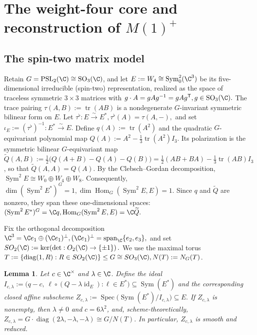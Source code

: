 \documentclass[12pt,leqno]{amsart}
\numberwithin{equation}{section} \newtheorem{thm}{Theorem}[section] \newtheorem{lem}[thm]{Lemma} \newtheorem{ex}[thm]{Example} \newtheorem{prop}[thm]{Proposition} \newtheorem{cor}[thm]{Corollary} \newtheorem{defi}[thm]{Definition} \newtheorem{rmk}[thm]{Remark} \newtheorem{notation}[thm]{Notation}
\newcommand{\id}{\operatorname{id}}
\newcommand{\Sym}{\operatorname{Sym}}
\newcommand{\Spec}{\operatorname{Spec}}
\newcommand{\Hom}{\operatorname{Hom}}
\newcommand{\SO}{\operatorname{SO}}
\newcommand{\PSLtwo}{\operatorname{PSL}_2(\C)}
\begin{document}
\section{The weight-four core and reconstruction of \texorpdfstring{$M(1)^+$}{M(1)+}}\label{sec:weight4}

\subsection{The spin-two matrix model}

Retain \(G=\PSLtwo\cong\SO_3(\C)\), and let $ E:=W_4\cong\Sym^2_0(\C^3) $ be its five-dimensional irreducible (spin-two) representation, realized as the space of traceless symmetric \(3\times3\) matrices with $ g\cdot A=gAg^{-1}=gAg^{\mathsf T}, g\in \SO_3(\C). $ The trace pairing $ \tau(A,B):=\operatorname{tr}(AB) $ is a nondegenerate \(G\)-invariant symmetric bilinear form on \(E\). Let $\tau^\flat:E\overset{\sim}{\longrightarrow}E^*,\tau^\flat(A)=\tau(A,-),$ and set $ \iota_E:=(\tau^\flat)^{-1}:E^*\overset{\sim}{\longrightarrow}E. $ Define $ q(A):=\operatorname{tr}(A^2) $ and the quadratic \(G\)-equivariant polynomial map $ Q(A):=A^2-\frac13\operatorname{tr}(A^2)I_3. $ Its polarization is the symmetric bilinear \(G\)-equivariant map \(\widetilde Q(A,B):= \frac12\bigl(Q(A+B)-Q(A)-Q(B)\bigr) = \frac12(AB+BA)-\frac13\operatorname{tr}(AB)I_3\), so that \(\widetilde Q(A,A)=Q(A)\). By the Clebsch--Gordan decomposition, $ \Sym^2E\cong W_0\oplus W_4\oplus W_8. $ Consequently, $ \dim(\Sym^2E^*)^G=1, \dim\Hom_G(\Sym^2E,E)=1. $ Since \(q\) and \(\widetilde Q\) are nonzero, they span these one-dimensional spaces: $ (\Sym^2E^*)^G=\C q, \Hom_G(\Sym^2E,E)=\C\widetilde Q. $

Fix the orthogonal decomposition $\C^3=\C e_1\oplus (\C e_1)^\perp, (\C e_1)^\perp=\operatorname{span}_{\C}\{e_2,e_3\},$ and set \(SO_2(\C):=\ker\!\left(\det:O_2(\C)\to\{\pm1\}\right).\) We use the maximal torus \(T:=\{\operatorname{diag}(1,R):R\in SO_2(\C)\}\leq G\cong SO_3(\C), N(T):=N_G(T)\).

\begin{lem}\label{lem:quadratic-orbit}
Let $c\in\C^\times$ and $\lambda\in\C$. Define the ideal \(I_{c,\lambda}:=\bigl(q-c,\ \ell\circ(Q-\lambda\id_E):\ell\in E^*\bigr)\subseteq\Sym(E^*)\) and the corresponding closed affine subscheme \(Z_{c,\lambda}:=\Spec\bigl(\Sym(E^*)/I_{c,\lambda}\bigr)\subseteq E.\) If $Z_{c,\lambda}$ is nonempty, then \(\lambda\ne0\) and \(c=6\lambda^2\), and, scheme-theoretically, \(Z_{c,\lambda}=G\cdot\operatorname{diag}(2\lambda,-\lambda,-\lambda)\cong G/N(T)\). In particular, $Z_{c,\lambda}$ is smooth and reduced.
\end{lem}
\end{document}
